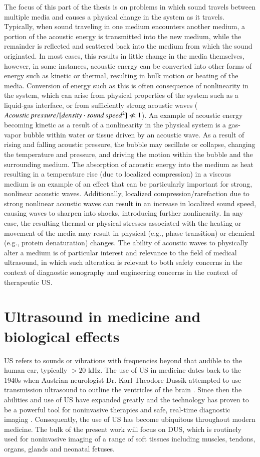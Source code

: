 The focus of this part of the thesis is on problems in which sound
travels between multiple media and causes a physical change in the
system as it travels. Typically, when sound traveling in one medium
encounters another medium, a portion of the acoustic energy is
transmitted into the new medium, while the remainder is reflected and
scattered back into the medium from which the sound originated. In
most cases, this results in little change in the media themselves,
however, in some instances, acoustic energy can be converted into
other forms of energy such as kinetic or thermal, resulting in bulk
motion or heating of the media. Conversion of energy such as this is
often consequence of nonlinearity in the system, which can arise from
physical properties of the system such as a liquid-gas interface, or
from sufficiently strong acoustic waves
($Acoustic\, pressure / [density \cdot sound\, speed^2] \nll 1$). An
example of acoustic energy becoming kinetic as a result of a
nonlinearity in the physical system is a gas-vapor bubble within water
or tissue driven by an acoustic wave. As a result of rising and
falling acoustic pressure, the bubble may oscillate or collapse,
changing the temperature and pressure, and driving the motion within
the bubble and the surrounding medium. The absorption of acoustic
energy into the medium as heat resulting in a temperature rise (due to
localized compression) in a viscous medium is an example of an effect
that can be particularly important for strong, nonlinear acoustic
waves. Additionally, localized compression/rarefaction due to strong
nonlinear acoustic waves can result in an increase in localized sound
speed, causing waves to sharpen into shocks, introducing further
nonlinearity. In any case, the resulting thermal or physical stresses
associated with the heating or movement of the media may result in
physical (e.g., phase transition) or chemical (e.g., protein
denaturation) changes. The ability of acoustic waves to physically
alter a medium is of particular interest and relevance to the field of
medical ultrasound, in which such alteration is relevant to both
safety concerns in the context of diagnostic sonography and
engineering concerns in the context of therapeutic \ac{US}.

\acresetall
\section{Ultrasound in medicine and biological effects} %
\ac{US} refers to sounds or vibrations with frequencies beyond that
audible to the human ear, typically $>20$ kHz. The use of \ac{US} in
medicine dates back to the 1940s when Austrian neurologist Dr. Karl
Theodore Dussik attempted to use transmission ultrasound to outline
the ventricles of the brain \citep{Dussik1942,Singh2007}. Since then
the abilities and use of \ac{US} have expanded greatly and the
technology has proven to be a powerful tool for noninvasive therapies
and safe, real-time diagnostic imaging
\citep{Dalecki2004}. Consequently, the use of \ac{US} has become
ubiquitous throughout modern medicine. The bulk of the present work
will focus on \ac{DUS}, which is routinely used for noninvasive
imaging of a range of soft tissues including muscles, tendons, organs,
glands and neonatal fetuses.


